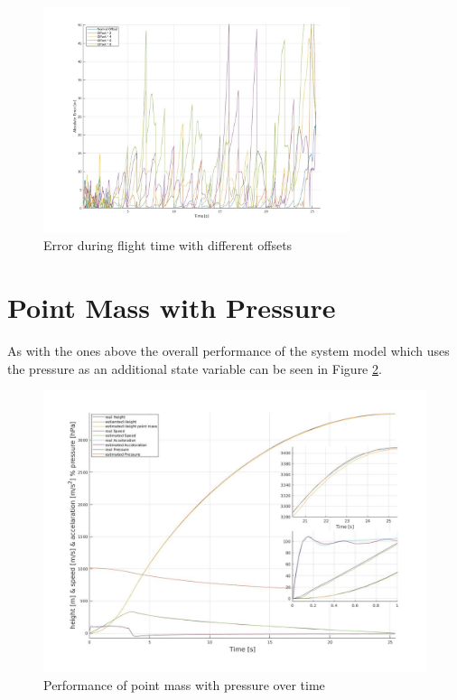 \begin{figure}[h!]
 \centering
 \includegraphics[width=0.8\textwidth]{./Pictures/PointMassOffsetErrorWithOffset.jpg}
  \caption{Error during flight time with different offsets}
 \label{fig:PointMassOffsetErrorWithOffset}
\end{figure}


\newpage
\section{Point Mass with Pressure}
As with the ones above the overall performance of the system model which uses the pressure as an additional state variable can be seen in Figure \ref{fig:PointMassPressurePerformance}.

\begin{figure}[h!]
 \centering
 \includegraphics[width=.8 \textwidth]{./Pictures/PointMassPressurePerformance.jpg}
 \caption{Performance of point mass with pressure over time}
 \label{fig:PointMassPressurePerformance}
\end{figure}

